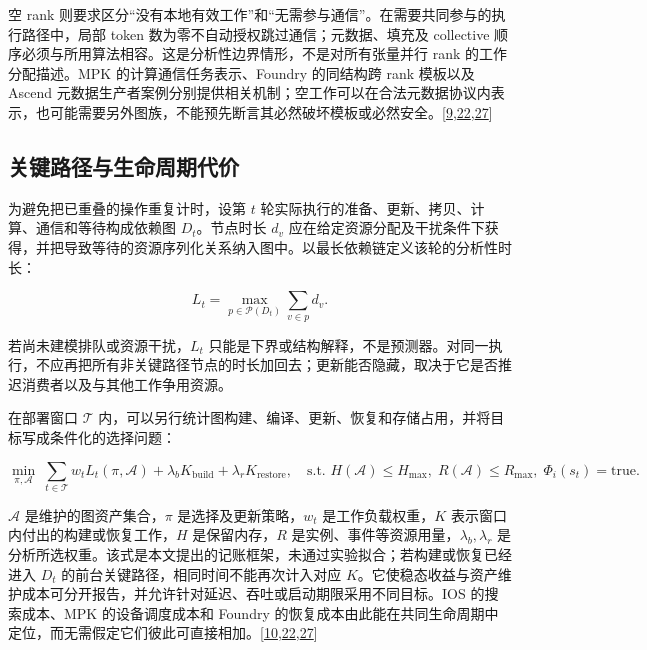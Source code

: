 \documentclass[
  UTF8,
  zihao=5]{ctexart}
\begin{document}
空 rank
则要求区分``没有本地有效工作''和``无需参与通信''。在需要共同参与的执行路径中，局部
token 数为零不自动授权跳过通信；元数据、填充及 collective
顺序必须与所用算法相容。这是分析性边界情形，不是对所有张量并行 rank
的工作分配描述。MPK 的计算通信任务表示、Foundry 的同结构跨 rank 模板以及
Ascend
元数据生产者案例分别提供相关机制；空工作可以在合法元数据协议内表示，也可能需要另外图族，不能预先断言其必然破坏模板或必然安全。{[}\protect\hyperlink{ref-vllmascendpr21259}{9},\protect\hyperlink{ref-liu2026foundry}{22},\protect\hyperlink{ref-cheng2026mpk}{27}{]}

\hypertarget{ux5173ux952eux8defux5f84ux4e0eux751fux547dux5468ux671fux4ee3ux4ef7}{%
\subsection*{关键路径与生命周期代价}\label{ux5173ux952eux8defux5f84ux4e0eux751fux547dux5468ux671fux4ee3ux4ef7}}

为避免把已重叠的操作重复计时，设第 \(t\)
轮实际执行的准备、更新、拷贝、计算、通信和等待构成依赖图
\(D_t\)。节点时长 \(d_v\)
应在给定资源分配及干扰条件下获得，并把导致等待的资源序列化关系纳入图中。以最长依赖链定义该轮的分析性时长：

\[ L_t=\max_{p\in\mathcal P(D_t)}\sum_{v\in p}d_v. \]

若尚未建模排队或资源干扰，\(L_t\)
只能是下界或结构解释，不是预测器。对同一执行，不应再把所有非关键路径节点的时长加回去；更新能否隐藏，取决于它是否推迟消费者以及与其他工作争用资源。

在部署窗口 \(\mathcal T\)
内，可以另行统计图构建、编译、更新、恢复和存储占用，并将目标写成条件化的选择问题：

\[ \min_{\pi,\mathcal A}\;\sum_{t\in\mathcal T}w_t L_t(\pi,\mathcal A)
 +\lambda_b K_{\mathrm{build}}+\lambda_r K_{\mathrm{restore}},
 \quad \text{s.t. } H(\mathcal A)\le H_{\max},\;R(\mathcal A)\le R_{\max},\;\Phi_i(s_t)=\mathrm{true}. \]

\(\mathcal A\) 是维护的图资产集合，\(\pi\) 是选择及更新策略，\(w_t\)
是工作负载权重，\(K\) 表示窗口内付出的构建或恢复工作，\(H\)
是保留内存，\(R\) 是实例、事件等资源用量，\(\lambda_b,\lambda_r\)
是分析所选权重。该式是本文提出的记账框架，未通过实验拟合；若构建或恢复已经进入
\(D_t\) 的前台关键路径，相同时间不能再次计入对应
\(K\)。它使稳态收益与资产维护成本可分开报告，并允许针对延迟、吞吐或启动期限采用不同目标。IOS
的搜索成本、MPK 的设备调度成本和 Foundry
的恢复成本由此能在共同生命周期中定位，而无需假定它们彼此可直接相加。{[}\protect\hyperlink{ref-ding2021ios}{10},\protect\hyperlink{ref-liu2026foundry}{22},\protect\hyperlink{ref-cheng2026mpk}{27}{]}
\end{document}
